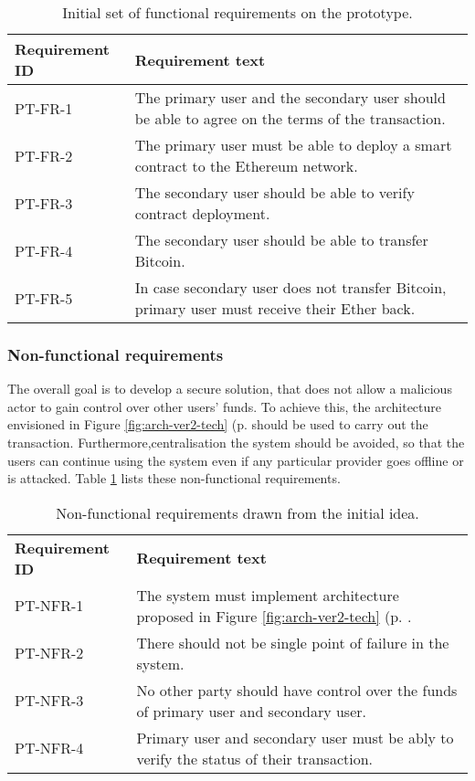 \begin{table}[ht]
    \centering
    \begin{tabularx}{\textwidth}{|l|X|}
    \hline
    \textbf{Requirement ID}& \textbf{Requirement text}\\
    \hline
    PT-FR-1 & The primary user and the secondary user should be able to agree on the terms of the transaction.\\
    PT-FR-2 & The primary user must be able to deploy a smart contract to the Ethereum network.\\
    PT-FR-3 & The secondary user should be able to verify contract deployment.\\
    PT-FR-4 & The secondary user should be able to transfer Bitcoin.\\
    PT-FR-5 & In case secondary user does not transfer Bitcoin, primary user must receive their Ether back.\\
    \hline
    \end{tabularx}
    \caption{Initial set of functional requirements on the prototype.}
    \label{tab:pt-func-reqs}
    \end{table}

% 
\subsubsection{Non-functional requirements}
The overall goal is to develop a secure solution, that does not allow a malicious actor to gain control over other users' funds. To achieve this, the architecture envisioned in Figure \ref{fig:arch-ver2-tech} (p. \pageref{fig:arch-ver2-tech} should be used to carry out the transaction. Furthermore,centralisation the system should be avoided, so that the users can continue using the system even if any particular provider goes offline or is attacked. Table \ref{tab:pt-func-reqs} lists these non-functional requirements.

\begin{table}[ht]
    \centering
    \begin{tabularx}{\textwidth}{|l|X|}
    \hline
    \textbf{Requirement ID}&\textbf{Requirement text}\\
    PT-NFR-1 & The system must implement architecture proposed in Figure \ref{fig:arch-ver2-tech} (p. \pageref{fig:arch-ver2-tech}.\\
    PT-NFR-2 & There should not be single point of failure in the system.\\
    PT-NFR-3 & No other party should have control over the funds of primary user and secondary user.\\
    PT-NFR-4 & Primary user and secondary user must be ably to verify the status of their transaction.\\
    \hline
    \end{tabularx}
    \caption{Non-functional requirements drawn from the initial idea.}
    \label{tab:pt-nonfunc-reqs}
\end{table}


